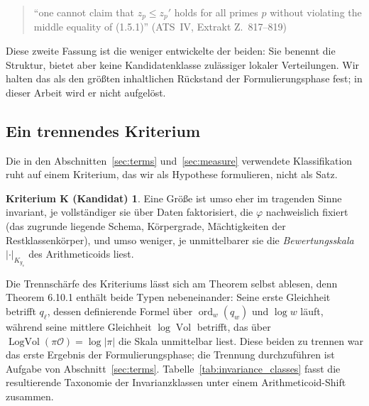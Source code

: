 \documentclass[11pt,a4paper]{article}
\theoremstyle{definition}
\theoremstyle{plain}
\theoremstyle{definition}
\newtheorem*{criterionK}{Kriterium K (Kandidat)}
\newcommand{\ordd}{\operatorname{ord}}
\newcommand{\Vol}{\operatorname{Vol}}
\newcommand{\LogVol}{\operatorname{LogVol}}
\newcommand{\anchor}[2]{(#1, Extrakt Z.~#2)}
\begin{document}
\begin{quote}\small
``one cannot claim that $z_p \le z_p'$ holds for all primes $p$ without violating
the middle equality of (1.5.1)'' \hfill\anchor{ATS~IV}{817--819}
\end{quote}

Diese zweite Fassung ist die weniger entwickelte der beiden: Sie benennt die
Struktur, bietet aber keine Kandidatenklasse zulässiger lokaler Verteilungen. Wir
halten das als den größten inhaltlichen Rückstand der Formulierungsphase fest; in
dieser Arbeit wird er nicht aufgelöst.

\subsection{Ein trennendes Kriterium}

Die in den Abschnitten~\ref{sec:terms} und~\ref{sec:measure} verwendete
Klassifikation ruht auf einem Kriterium, das wir als Hypothese formulieren, nicht
als Satz.

\begin{criterionK}
Eine Größe ist umso eher im tragenden Sinne invariant, je vollständiger sie über
Daten faktorisiert, die $\varphi$ nachweislich fixiert (das zugrunde liegende
Schema, Körpergrade, Mächtigkeiten der Restklassenkörper), und umso weniger, je
unmittelbarer sie die \emph{Bewertungsskala} $|\cdot|_{K_{y_v}}$ des Arithmeticoids
liest.
\end{criterionK}

Die Trennschärfe des Kriteriums lässt sich am Theorem selbst ablesen, denn
Theorem 6.10.1 enthält beide Typen nebeneinander: Seine erste Gleichheit betrifft
$q_\ell$, dessen definierende Formel über $\ordd_w(q_w)$ und $\log w$ läuft,
während seine mittlere Gleichheit $\log \Vol$ betrifft, das über
$\LogVol(\pi \mathcal{O}) = \log|\pi|$ die Skala unmittelbar liest. Diese beiden zu
trennen war das erste Ergebnis der Formulierungsphase; die Trennung durchzuführen
ist Aufgabe von Abschnitt~\ref{sec:terms}. Tabelle~\ref{tab:invariance_classes}
fasst die resultierende Taxonomie der Invarianzklassen unter einem Arithmeticoid-Shift zusammen.
\end{document}
